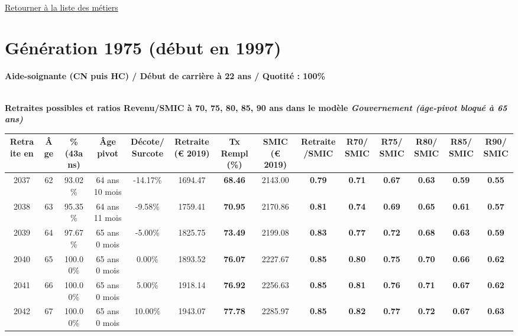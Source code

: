~\\ 
 
 \hyperlink{page.2}{\noindent Retourner à la liste des métiers}

 \newpage 

\section{Génération 1975 (début en 1997)\label{AideSoignant_100_1975_22_0}} 
 
{\bf \noindent Aide-soignante (CN puis HC) / Début de carrière à 22 ans / Quotité : 100\%}  ~ 

 ~\\{\bf \noindent Retraites possibles et ratios Revenu/SMIC à 70, 75, 80, 85, 90 ans dans le modèle \emph{Gouvernement (âge-pivot bloqué à 65 ans)}}  
 
\begin{adjustbox}{max width=\textwidth} 
\begin{tabular}[htb]{|c|c||c|c|c||c|c||c|c||c|c|c|c|c|} 
\hline 
 Retraite en &  Âge &  \%(43ans) &  Âge pivot &  Décote/Surcote &  Retraite (\euro{} 2019) &  Tx Rempl(\%) &  SMIC (\euro{} 2019) &  Retraite/SMIC &  R70/SMIC &  R75/SMIC &  R80/SMIC &  R85/SMIC &  R90/SMIC \\ 
\hline \hline 
 2037 &  62 &  93.02\% &  64 ans 10 mois &  -14.17\% &  1694.47 &  {\bf 68.46} &  2143.00 &  {\bf {\color{red} 0.79}} &  {\bf {\color{red} 0.71}} &  {\bf {\color{red} 0.67}} &  {\bf {\color{red} 0.63}} &  {\bf {\color{red} 0.59}} &  {\bf {\color{red} 0.55}} \\ 
\hline 
 2038 &  63 &  95.35\% &  64 ans 11 mois &  -9.58\% &  1759.41 &  {\bf 70.95} &  2170.86 &  {\bf {\color{red} 0.81}} &  {\bf {\color{red} 0.74}} &  {\bf {\color{red} 0.69}} &  {\bf {\color{red} 0.65}} &  {\bf {\color{red} 0.61}} &  {\bf {\color{red} 0.57}} \\ 
\hline 
 2039 &  64 &  97.67\% &  65 ans 0 mois &  -5.00\% &  1825.75 &  {\bf 73.49} &  2199.08 &  {\bf {\color{red} 0.83}} &  {\bf {\color{red} 0.77}} &  {\bf {\color{red} 0.72}} &  {\bf {\color{red} 0.68}} &  {\bf {\color{red} 0.63}} &  {\bf {\color{red} 0.59}} \\ 
\hline 
 2040 &  65 &  100.00\% &  65 ans 0 mois &  0.00\% &  1893.52 &  {\bf 76.07} &  2227.67 &  {\bf {\color{red} 0.85}} &  {\bf {\color{red} 0.80}} &  {\bf {\color{red} 0.75}} &  {\bf {\color{red} 0.70}} &  {\bf {\color{red} 0.66}} &  {\bf {\color{red} 0.62}} \\ 
\hline 
 2041 &  66 &  100.00\% &  65 ans 0 mois &  5.00\% &  1918.14 &  {\bf 76.92} &  2256.63 &  {\bf {\color{red} 0.85}} &  {\bf {\color{red} 0.81}} &  {\bf {\color{red} 0.76}} &  {\bf {\color{red} 0.71}} &  {\bf {\color{red} 0.67}} &  {\bf {\color{red} 0.62}} \\ 
\hline 
 2042 &  67 &  100.00\% &  65 ans 0 mois &  10.00\% &  1943.07 &  {\bf 77.78} &  2285.97 &  {\bf {\color{red} 0.85}} &  {\bf {\color{red} 0.82}} &  {\bf {\color{red} 0.77}} &  {\bf {\color{red} 0.72}} &  {\bf {\color{red} 0.67}} &  {\bf {\color{red} 0.63}} \\ 
\hline 
\hline 
\end{tabular} 
\end{adjustbox} 
 
